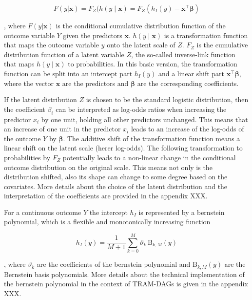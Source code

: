 \begin{equation}
F(y|\mathbf{x}) = F_Z(h(y \mid \mathbf{x}) =  F_Z(h_I(y) - \mathbf{x}^\top \boldsymbol{\beta})
\end{equation}

, where $F(y|\mathbf{x})$ is the conditional cumulative distribution function of the outcome variable $Y$ given the predictors $\mathbf{x}$. $h(y \mid \mathbf{x})$ is a transformation function that maps the outcome variable $y$ onto the latent scale of $Z$. $F_Z$ is the cumulative distribution function of a latent variable $Z$, the so-called inverse-link function that maps $h(y \mid \mathbf{x})$ to probabilities. In this basic version, the transformation function can be split into an intercept part $h_I(y)$ and a linear shift part $\mathbf{x}^\top \boldsymbol{\beta}$, where the vector $\mathbf{x}$ are the predictors and $\boldsymbol{\beta}$ are the corresponding coefficients.

If the latent distribution $Z$ is chosen to be the standard logistic distribution, then the coefficient $\beta_i$ can be interpreted as log-odds ratios when increasing the predictor $x_i$ by one unit, holding all other predictors unchanged. This means that an increase of one unit in the predictor $x_i$ leads to an increase of the log-odds of the outcome $Y$ by $\boldsymbol{\beta}$. The additive shift of the transformation function means a linear shift on the latent scale (herer log-odds). The following transformation to probabilities by $F_Z$ potentially leads to a non-linear change in the conditional outcome distribution on the original scale. This means not only is the distribution shifted, also its shape can change to some degree based on the covariates. More details about the choice of the latent distribution and the interpretation of the coefficients are provided in the appendix XXX. 


For a continuous outcome $Y$ the intercept $h_I$ is represented by a bernstein polynomial, which is a flexible and monotonically increasing function

\begin{equation}
h_I(y) = \frac{1}{M + 1} \sum_{k=0}^{M} \vartheta_k \, \text{B}_{k, M}(y)
\end{equation}

, where $\vartheta_k$ are the coefficients of the bernstein polynomial and $\text{B}_{k, M}(y)$ are the Bernstein basis polynomials. More details about the technical implementation of the bernstein polynomial in the context of TRAM-DAGs is given in the appendix XXX.

